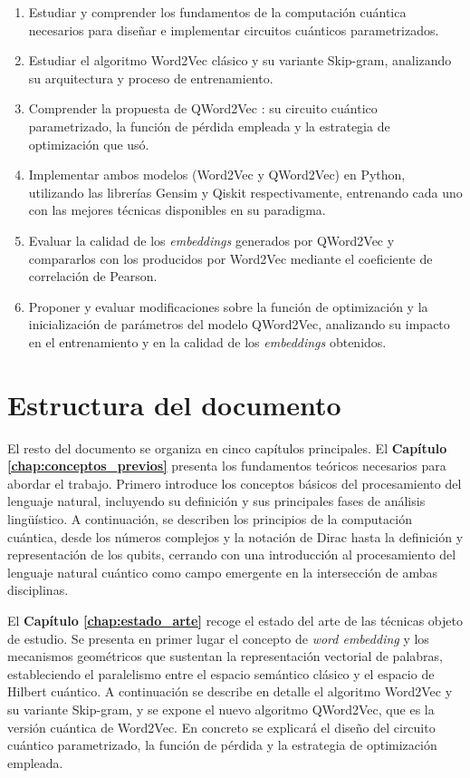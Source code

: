 \begin{enumerate}
  \item Estudiar y comprender los fundamentos de la computación cuántica necesarios para diseñar e implementar circuitos cuánticos parametrizados.
  \item Estudiar el algoritmo Word2Vec clásico y su variante Skip-gram, analizando su arquitectura y proceso de entrenamiento.
  \item Comprender la propuesta de QWord2Vec \cite{ohno_qword2vec_2025}: su circuito cuántico parametrizado, la función de pérdida empleada y la estrategia de optimización que usó.
  \item Implementar ambos modelos (Word2Vec y QWord2Vec) en Python, utilizando las librerías Gensim y Qiskit respectivamente, entrenando cada uno con las mejores técnicas disponibles en su paradigma.
  \item Evaluar la calidad de los \textit{embeddings} generados por QWord2Vec y compararlos con los producidos por Word2Vec mediante el coeficiente de correlación de Pearson.
  \item Proponer y evaluar modificaciones sobre la función de optimización y la inicialización de parámetros del modelo QWord2Vec, analizando su impacto en el entrenamiento y en la calidad de los \textit{embeddings} obtenidos.
\end{enumerate}

\section{Estructura del documento}

El resto del documento se organiza en cinco capítulos principales. El \textbf{Capítulo \ref{chap:conceptos_previos}} presenta los fundamentos teóricos necesarios para abordar el trabajo. Primero introduce los conceptos básicos del procesamiento del lenguaje natural, incluyendo su definición y sus principales fases de análisis lingüístico. A continuación, se describen los principios de la computación cuántica, desde los números complejos y la notación de Dirac hasta la definición y representación de los qubits, cerrando con una introducción al procesamiento del lenguaje natural cuántico como campo emergente en la intersección de ambas disciplinas.

El \textbf{Capítulo \ref{chap:estado_arte}} recoge el estado del arte de las técnicas objeto de estudio. Se presenta en primer lugar el concepto de \textit{word embedding} y los mecanismos geométricos que sustentan la representación vectorial de palabras, estableciendo el paralelismo entre el espacio semántico clásico y el espacio de Hilbert cuántico. A continuación se describe en detalle el algoritmo Word2Vec y su variante Skip-gram, y se expone el nuevo algoritmo QWord2Vec, que es la versión cuántica de Word2Vec. En concreto se explicará el diseño del circuito cuántico parametrizado, la función de pérdida y la estrategia de optimización empleada.

